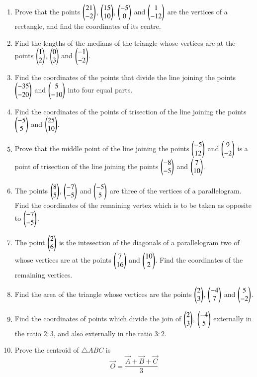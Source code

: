 \begin{enumerate}[label=\arabic*.,ref=\thesubsection.\theenumi]
\item Prove that the points $\begin{pmatrix}21\\-2\end{pmatrix}$, $\begin{pmatrix}15\\10\end{pmatrix}$, $\begin{pmatrix}-5\\0\end{pmatrix}$  and $\begin{pmatrix}1\\-12\end{pmatrix}$ are the vertices of a rectangle, and find the
coordinates of its centre.
\item Find the lengths of the medians of the triangle whose vertices are at the points $\begin{pmatrix}1\\2\end{pmatrix}$, $\begin{pmatrix}0\\3\end{pmatrix}$ and $\begin{pmatrix}-1\\-2\end{pmatrix}$.
\item Find the coordinates of the points that divide the line joining the points $\begin{pmatrix}-35\\-20\end{pmatrix}$ and $\begin{pmatrix}5\\-10\end{pmatrix}$ into four equal parts.
\item Find the coordinates of the points of trisection of the line joining the points $\begin{pmatrix}-5\\5\end{pmatrix}$ and $\begin{pmatrix}25\\10\end{pmatrix}$.
\item Prove that the middle point of the line joining the points $\begin{pmatrix}-5\\12\end{pmatrix}$ and $\begin{pmatrix}9\\-2\end{pmatrix}$ is a point of trisection of the line
joining the points $\begin{pmatrix}-8\\-5\end{pmatrix}$ and $\begin{pmatrix}7\\10\end{pmatrix}$.
\\
\solution

\item The points $\begin{pmatrix}8\\5\end{pmatrix}$, $\begin{pmatrix}-7\\-5\end{pmatrix}$ and $\begin{pmatrix}-5\\5\end{pmatrix}$ are three of the vertices of a parallelogram.  Find the coordinates of
the remaining vertex which is to be taken as opposite to $\begin{pmatrix}-7\\-5\end{pmatrix}$.
\item The point $\begin{pmatrix}2\\6\end{pmatrix}$ is the intesection of the diagonals of a parallelogram two of whose vertices are at the points $\begin{pmatrix}7\\16\end{pmatrix}$ and $\begin{pmatrix}10\\2\end{pmatrix}$.
Find the coordinates of the remaining vertices.
\item Find the area of the triangle whose vertices are the points $\begin{pmatrix}2\\3\end{pmatrix}$, $\begin{pmatrix}-4\\7\end{pmatrix}$ and $\begin{pmatrix}5\\-2\end{pmatrix}$.  
\item Find the coordinates of  points which divide the join of $\begin{pmatrix}2\\3\end{pmatrix}$, $\begin{pmatrix}-4\\5\end{pmatrix}$ externally in the ratio $2:3$, and also
externally in the ratio $3:2$.
\item Prove the centroid of $\triangle ABC$ is
\begin{equation}
\vec{O}=\frac{\vec{A}+\vec{B}+\vec{C}}{3}
\end{equation}


\end{enumerate}
